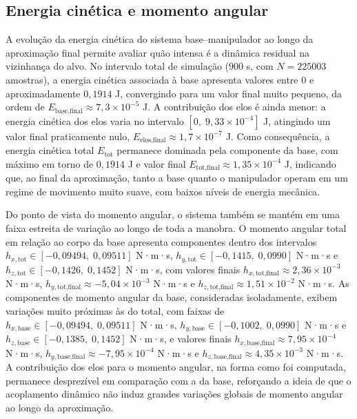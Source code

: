 \subsection{Energia cinética e momento angular}
\label{sec:cap4_app_final_energia_momento}

A evolução da energia cinética do sistema base–manipulador ao longo da aproximação final permite avaliar quão intensa é a dinâmica residual na vizinhança do alvo. No intervalo total de simulação ($900$ s, com $N = 225003$ amostras), a energia cinética associada à base apresenta valores entre $0$ e aproximadamente $0{,}1914$ J, convergindo para um valor final muito pequeno, da ordem de $E_{\text{base,final}} \approx 7{,}3\times 10^{-5}$ J. A contribuição dos elos é ainda menor: a energia cinética dos elos varia no intervalo $[0,\;9{,}33\times 10^{-4}]$ J, atingindo um valor final praticamente nulo, $E_{\text{elos,final}} \approx 1{,}7\times 10^{-7}$ J. Como consequência, a energia cinética total $E_{\text{tot}}$ permanece dominada pela componente da base, com máximo em torno de $0{,}1914$ J e valor final $E_{\text{tot,final}} \approx 1{,}35\times 10^{-4}$ J, indicando que, ao final da aproximação, tanto a base quanto o manipulador operam em um regime de movimento muito suave, com baixos níveis de energia mecânica.


Do ponto de vista do momento angular, o sistema também se mantém em uma faixa estreita de variação ao longo de toda a manobra. O momento angular total em relação ao corpo da base apresenta componentes dentro dos intervalos
$h_{x,\text{tot}} \in [-0{,}09494,\;0{,}09511]$ N·m·s,
$h_{y,\text{tot}} \in [-0{,}1415,\;0{,}0990]$ N·m·s e
$h_{z,\text{tot}} \in [-0{,}1426,\;0{,}1452]$ N·m·s,
com valores finais
$h_{x,\text{tot,final}} \approx 2{,}36\times 10^{-3}$ N·m·s,
$h_{y,\text{tot,final}} \approx -5{,}04\times 10^{-3}$ N·m·s e
$h_{z,\text{tot,final}} \approx 1{,}51\times 10^{-2}$ N·m·s.
As componentes de momento angular da base, consideradas isoladamente, exibem variações muito próximas às do total, com faixas de
$h_{x,\text{base}} \in [-0{,}09494,\;0{,}09511]$ N·m·s,
$h_{y,\text{base}} \in [-0{,}1002,\;0{,}0990]$ N·m·s e
$h_{z,\text{base}} \in [-0{,}1385,\;0{,}1452]$ N·m·s,
e valores finais
$h_{x,\text{base,final}} \approx 7{,}95\times 10^{-4}$ N·m·s,
$h_{y,\text{base,final}} \approx -7{,}95\times 10^{-4}$ N·m·s e
$h_{z,\text{base,final}} \approx 4{,}35\times 10^{-3}$ N·m·s.
A contribuição dos elos para o momento angular, na forma como foi computada, permanece desprezível em comparação com a da base, reforçando a ideia de que o acoplamento dinâmico não induz grandes variações globais de momento angular ao longo da aproximação.

